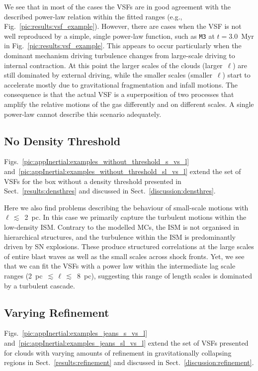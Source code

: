 We see that in most of the cases the VSFs are in good agreement with the described power-law relation within the fitted ranges (e.g., Fig.~\ref{pic:results:vsf_example}). 
However, there are cases when the VSF is not well reproduced by a simple, single power-law function, such as \texttt{M3} at $t=3.0$~Myr in Fig.~\ref{pic:results:vsf_example}.
This appears to occur particularly when the dominant mechanism driving turbulence changes from large-scale driving to internal contraction. 
At this point the  larger scales of the clouds (larger~$\ell$) are still dominated by external driving, while the smaller scales (smaller~$\ell$) start to accelerate mostly due to gravitational fragmentation and infall motions.
The consequence is that the actual VSF is a superposition of two processes that amplify the relative motions of the gas differently and on different scales.
A single power-law cannot describe this scenario adequately. 


\subsection{No Density Threshold} \label{Bsub:full}

Figs.~\ref{pic:appInertial:examples_without_threshold_s_vs_l} and~\ref{pic:appInertial:examples_without_threshold_sl_vs_l} extend the set of VSFs for the box without a density threshold presented in Sect.~\ref{results:densthres} and discussed in Sect.~\ref{discussion:densthres}.

Here we also find problems describing the behaviour of small-scale motions with $\ell\,\lesssim$~2~pc.
In this case we primarily capture the turbulent motions within the low-density ISM. 
Contrary to the modelled MCs, the ISM is not organised in hierarchical structures, and the turbulence within the ISM is predominantly driven by SN explosions.
These produce structured correlations at the large scales of entire blast waves as well as the small scales across shock fronts.
Yet, we see that we can fit the VSFs with a power law within the intermediate lag scale ranges (2~pc~$\lesssim\,\ell\,\lesssim$~8~pc), suggesting this range of length scales is dominated by a turbulent cascade.



\subsection{Varying Refinement} \label{Bsub:Jeans}

Figs.~\ref{pic:appInertial:examples_jeans_s_vs_l} and~\ref{pic:appInertial:examples_jeans_sl_vs_l} extend the set of VSFs presented for clouds with varying amounts of refinement in gravitationally collapsing regions in Sect.~\ref{results:refinement} and discussed in Sect.~\ref{discussion:refinement}.

